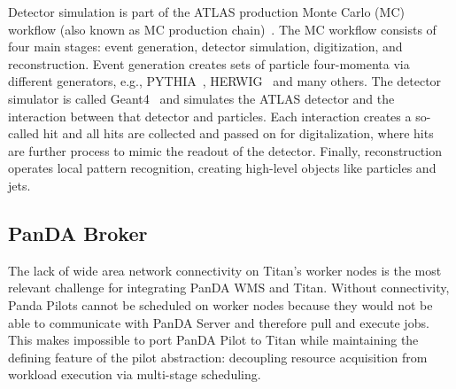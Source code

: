 Detector simulation is part of the ATLAS production Monte Carlo (MC) workflow
(also known as MC production
chain)~\cite{rimoldi2006atlas,de2013delphes,ritsch2014atlas}. The MC workflow
consists of four main stages: event generation, detector simulation,
digitization, and reconstruction. Event generation creates sets of particle
four-momenta via different generators, e.g., PYTHIA~\cite{sjostrand2006pythia},
HERWIG~\cite{corcella2001herwig} and many others.  The detector simulator is called
Geant4~\cite{agostinelli2003geant4} and simulates the ATLAS detector and the
interaction between that detector and particles.
Each interaction creates a so-called hit and all hits are collected and passed
on for digitalization, where hits are further process to mimic the readout of
the detector. Finally, reconstruction operates local pattern recognition,
creating high-level objects like particles and jets.



\subsection{PanDA Broker}
\label{ssec:panda_titan}

The lack of wide area network connectivity on Titan's worker nodes is the most
relevant challenge for integrating PanDA WMS and Titan. Without connectivity,
Panda Pilots cannot be scheduled on worker nodes because they would not be able
to communicate with PanDA Server and therefore pull and execute jobs. This makes
impossible to port PanDA Pilot to Titan while maintaining the defining feature
of the pilot abstraction: decoupling resource acquisition from workload
execution via multi-stage scheduling.

